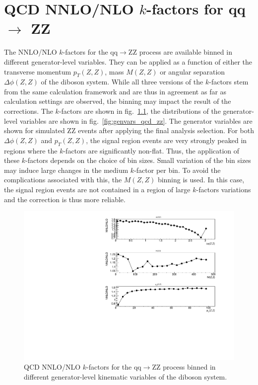 \chapter{QCD NNLO/NLO $k$-factors for qq $\rightarrow$ ZZ}
\label{app:kfactor_qcd_zz}

The NNLO/NLO $k$-factors for the qq$\rightarrow$ZZ process are available binned in different generator-level variables.
They can be applied as a function of either the transverse momentum $p_{T}(Z,Z)$,
mass $M(Z,Z)$ or angular separation $\Delta\phi(Z,Z)$ of the diboson system.
While all three versions of the $k$-factors stem from the same calculation framework and are thus in agreement as far
as calculation settings are observed, the binning may impact the result of the corrections.
The $k$-factors are shown in fig.~\ref{fig:kfactor_qcd_zz}, the distributions of the generator-level variables are shown in fig.~\ref{fig:genvars_qcd_zz}.
The generator variables are shown for simulated ZZ events after applying the final analysis selection.
For both $\Delta\phi(Z,Z)$ and $p_{T}(Z,Z)$, the signal region events are very strongly peaked in regions where the $k$-factors are significantly non-flat.
Thus, the application of these $k$-factors depends on the choice of bin sizes. Small variation of the bin sizes may induce large changes in the medium
$k$-factor per bin. To avoid the complications associated with this, the $M(Z,Z)$ binning is used. In this case, the signal region events are not contained in a
region of large $k$-factors variations and the correction is thus more reliable.

\begin{figure}[htbp]
\begin{center}
\includegraphics[width=\textwidth]{figures/kfactors.pdf}
\caption{QCD NNLO/NLO $k$-factors for the qq$\rightarrow$ZZ process binned in different generator-level kinematic variables of the diboson system.
}
\label{fig:kfactor_qcd_zz}
\end{center}
\end{figure}

